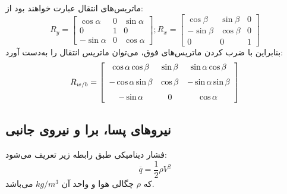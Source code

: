 ماتریس‌های انتقال عبارت خواهند بود از:
\begin{equation}
R_y=\begin{bmatrix}
\cos{\alpha} & 0 & \sin{\alpha}  \\
0 & 1 &0  \\
- \sin{\alpha} &0 &\cos{\alpha}
\end{bmatrix} ;
R_x=\begin{bmatrix}
\cos{\beta} & \sin{\beta} & 0  \\
-\sin{\beta} & \cos{\beta} &0  \\
0 &0 &1
\end{bmatrix}
\end{equation}
بنابراین با ضرب کردن ماتریس‌های فوق، می‌توان ماتریس انتقال را به‌دست آورد:
\begin{equation}\label{eq:wind2body}
R_{w/b}= \left[ \begin {array}{ccc} \cos{\alpha} \cos{\beta} &\sin{\beta} &\sin{\alpha} \cos{\beta} 
\\ \noalign{\medskip}-\cos{\alpha} \sin{\beta} &\cos{\beta} &-\sin{\alpha} \sin{\beta} 
\\ \noalign{\medskip}-\sin{\alpha} &0&\cos{\alpha} \end {array} \right]
\end{equation}
\subsection{نیروهای پسا، برا و نیروی جانبی}
فشار دینامیکی طبق رابطه زیر تعریف می‌شود:
\begin{equation}
\overline{q}=\dfrac{1}{2} \rho V^{2}
\end{equation}
که $\rho$ چگالی هوا و واحد آن
 $kg/m^{3}$
  می‌باشد.

